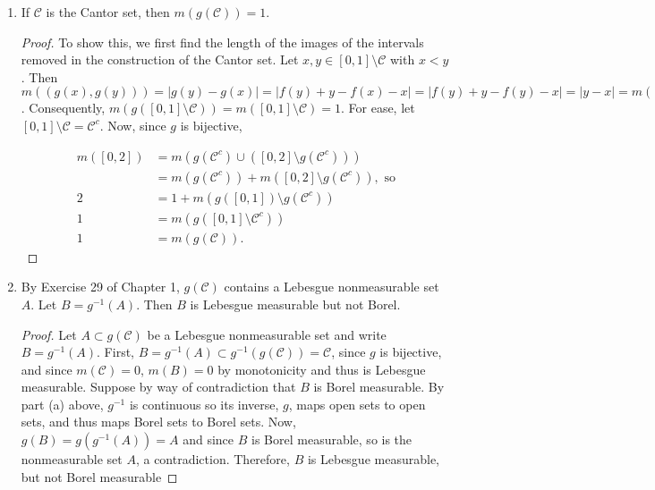 \documentclass[11pt,oneside,english]{amsart}
\theoremstyle{definition}
\newcommand{\MC}[1]{\mathcal{#1}}
\begin{document}
\begin{enumerate}
\begin{enumerate}
\begin{proof}
To show $h=g^{-1}$ is continuous, let $(a,b)\subset [0,1]$. Then since $g$ is bijective, $h^{-1}(a)=(g^{-1})^{-1}(a)=g(a)=f(a)+a$ and $h^{-1}(b)=(g^{-1})^{-1}(b)=g(b)=f(b)+b$. Since $a<b$, $h^{-1}(a)<h^{-1}(b)$, and since $a$ and $b$ were chosen arbitrarily, $h$ maps open intervals to open intervals.
\end{proof}



\item If $\MC{C}$ is the Cantor set, then $m(g(\MC{C}))=1$.

\begin{proof}

To show this, we first find the length of the images of the intervals removed in the construction of the Cantor set. Let $x,y\in[0,1]\setminus\MC{C}$ with $x<y$. Then $m((g(x),g(y)))=|g(y)-g(x)|=|f(y)+y-f(x)-x|=|f(y)+y-f(y)-x|=|y-x|=m((x,y))$. Consequently, $m(g([0,1]\setminus\MC{C}))=m([0,1]\setminus\MC{C})=1$. For ease, let $[0,1]\setminus \MC{C}=\MC{C}^c$. Now, since $g$ is bijective,

\begin{align*}
m([0,2])&=m(g(\MC{C}^c)\cup([0,2]\setminus g(\MC{C}^c)))\\[2mm]
&=m(g(\MC{C}^c))+m([0,2]\setminus g(\MC{C}^c)),\text{ so}\\[2mm]
2&=1+m(g([0,1])\setminus g(\MC{C}^c))\\[2mm]
1&=m(g([0,1]\setminus\MC{C}^c))\\[2mm]
1&=m(g(\MC{C})).
\end{align*}

\end{proof}

\item By Exercise 29 of Chapter 1, $g(\MC{C})$ contains a Lebesgue nonmeasurable set $A$. Let $B=g^{-1}(A)$. Then $B$ is Lebesgue measurable but not Borel.

\begin{proof}
Let $A\subset g(\MC{C})$ be a Lebesgue nonmeasurable set and write $B=g^{-1}(A)$. First, $B=g^{-1}(A)\subset g^{-1}(g(\MC{C}))=\MC{C}$, since $g$ is bijective, and since $m(\MC{C})=0$, $m(B)=0$ by monotonicity and thus is Lebesgue measurable. Suppose by way of contradiction that $B$ is Borel measurable. By part (a) above, $g^{-1}$ is continuous so its inverse, $g$, maps open sets to open sets, and thus maps Borel sets to Borel sets. Now, $g(B)=g(g^{-1}(A))=A$ and since $B$ is Borel measurable, so is the nonmeasurable set $A$, a contradiction. Therefore, $B$ is Lebesgue measurable, but not Borel measurable
\end{proof}


\end{enumerate}
\end{enumerate}
\end{document}
